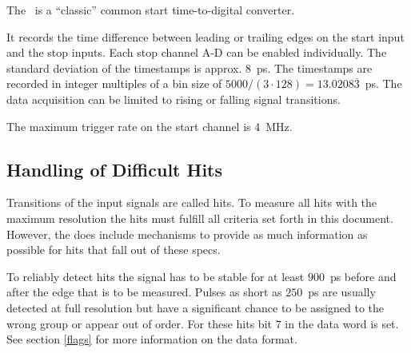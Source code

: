  { %
The \deviceName\ is a ``classic'' common start time-to-digital converter. 

It records the time difference between leading or trailing edges on the start input and the stop inputs. 
Each stop channel A-D can be enabled individually. 
The standard deviation of the timestamps is approx. $8$~ps. 
The timestamps are recorded in integer multiples of a bin size of $5000/(3\cdot 128) = 13.0208\overline{3}$~ps. 
The data acquisition can be limited to rising or falling signal transitions. 

The maximum trigger rate on the start channel is 4~MHz.

\subsection{Handling of Difficult Hits}
    \label{difficulthits}
    Transitions of the input signals are called hits. To measure all hits with the maximum resolution the hits must fulfill all criteria set forth in this document.
    However, the \deviceName does include mechanisms to provide as much information as possible for hits that fall out of these specs.

    To reliably detect hits the signal has to be stable for at least $900$~ps before and after the edge that is to be measured. 
    Pulses as short as $250$~ps are usually detected at full resolution but have a significant chance to be assigned to the wrong group or appear out of order. 
    For these hits bit 7 in the data word is set. See section \ref{flags} for more information on the data format.

}
